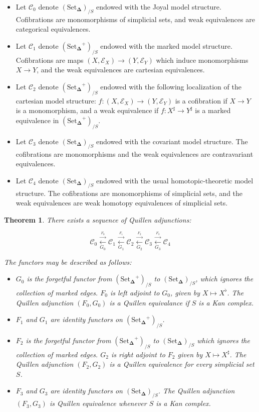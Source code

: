 \documentclass[12pt]{amsart}
\newcommand{\8}{\ensuremath{\infty}}
\newcommand{\C}{\ensuremath{\mathscr{C}}}
\newcommand{\SSet}{\ensuremath{\text{Set}_{\boldsymbol{\Delta}}}}
\newcommand{\adj}[2]{\ensuremath{\overset{\overset{#1}{ \rightarrow}}{\underset{#2}{\leftarrow}}}}
\newtheorem{theorem}{Theorem}
\begin{document}
\begin{itemize}
  \item[(0)] Let $\C_0$ denote $(\SSet)_{/S}$ endowed with the Joyal model structure. Cofibrations are monomorphisms of simplicial sets, and weak equivalences are categorical equivalences.
  \item[(1)]  Let $\C_1$ denote $(\SSet^+)_{/S}$ endowed with the marked model structure. Cofibrations are maps $(X, \mathcal{E}_X) \rightarrow (Y, \mathcal{E}_Y)$ which induce monomorphisms $X \rightarrow Y$, and the weak equivalences are cartesian equivalences.
  \item[(2)]  Let $\C_2$ denote $(\SSet^+)_{/S}$ endowed with the following localization of the cartesian model structure: $f : (X, \mathcal{E}_X) \rightarrow (Y, \mathcal{E}_Y)$ is a cofibration if $X \rightarrow Y$ is a monomorphism, and a weak equivalence if $f : X^\sharp \rightarrow Y^\sharp$ is a marked equivalence in $(\SSet^+)_{/S}$.
  \item[(3)]  Let $\C_3$ denote $(\SSet)_{/S}$ endowed with the covariant model structure. The cofibrations are monomorphisms and the weak equivalences are contravariant equivalences.
  \item[(4)] Let $\C_4$ denote $(\SSet)_{/S}$ endowed with the usual homotopic-theoretic model structure. The cofibrations are monomorphisms of simplicial sets, and the weak equivalences are weak homotopy equivalences of simplicial sets.
\end{itemize}

\begin{theorem}
  There exists a sequence of Quillen adjunctions:

  $$
    \C_0 \adj{F_0}{G_0} \C_1 \adj{F_1}{G_1} \C_2 \adj{F_2}{G_2} \C_3 \adj{F_3}{G_3} \C_4
  $$

  The functors may be described as follows:
  \begin{itemize}
    \item[(A0)] $G_0$ is the forgetful functor from $(\SSet^+)_{/S}$ to $(\SSet)_{/S}$, which ignores the collection of marked edges. $F_0$ is left adjoint to $G_0$, given by $X \mapsto X^\flat$. The Quillen adjunction $(F_0, G_0)$ is a Quillen equivalance if $S$ is a Kan complex.
    \item[(A1)] $F_1$ and $G_1$ are identity functors on $(\SSet^+)_{/S}$.
    \item[(A2)]  $F_2$ is the forgetful functor from $(\SSet^+)_{/S}$ to $(\SSet)_{/S}$ which ignores the collection of marked edges. $G_2$ is right adjoint to $F_2$ given by $X \mapsto X^\sharp$. The Quillen adjunction $(F_2, G_2)$ is a Quillen equivalence for every simplicial set $S$.
    \item[(A3)]  $F_3$ and $G_3$ are identity functors on $(\SSet)_{/S}$. The Quillen adjunction $(F_3, G_3)$ is Quillen equivalence whenever $S$ is a Kan complex.
  \end{itemize}
\end{theorem}
\end{document}
